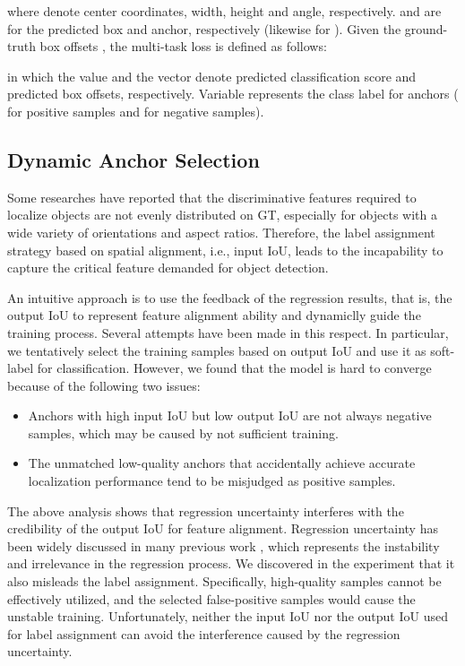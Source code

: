 \documentclass[letterpaper]{article} \usepackage{aaai21}  \usepackage{times}  \usepackage{helvet} \usepackage{courier}  \usepackage[hyphens]{url}  \usepackage{graphicx} \urlstyle{rm} \def\UrlFont{\rm}  \usepackage{natbib}  \usepackage{caption} \frenchspacing  \setlength{\pdfpagewidth}{8.5in}  \setlength{\pdfpageheight}{11in}  \usepackage{url}
\begin{document}
where  denote center coordinates, width, height and angle, respectively.  and  are for the predicted box and anchor, respectively (likewise for ). Given the ground-truth box offsets , the multi-task loss is defined as follows:

in which the value  and the vector  denote predicted classification score and predicted box offsets, respectively. Variable  represents the class label for anchors ( for positive samples and  for negative samples).

\subsection{Dynamic Anchor Selection}
Some researches \cite{zhang2019freeanchor, song2020revisiting} have reported that the discriminative features required to localize objects are not evenly distributed on GT, especially for objects with a wide variety of orientations and aspect ratios. Therefore, the label assignment strategy based on spatial alignment, i.e., input IoU, leads to the incapability to capture the critical feature demanded for object detection. 

An intuitive approach is to use the feedback of the regression results, that is, the output IoU to represent feature alignment ability and dynamiclly guide the training process. Several attempts \cite{jiang2018acquisition, li2020learning} have been made in this respect. In particular, we tentatively select the training samples based on output IoU and use it as soft-label for classification. However, we found that the model is hard to  converge because of the following two issues:

\begin{itemize}
	\item Anchors with high input IoU but low output IoU are not always negative samples, which may be caused by not sufficient training.
	\item The unmatched low-quality anchors that accidentally achieve accurate localization performance tend to be misjudged as positive samples.
\end{itemize} 


The above analysis shows that regression uncertainty interferes with the credibility of the output IoU for feature alignment. Regression uncertainty has been widely discussed in many previous work \cite{feng2018towards, choi2019gaussian, kendall2017uncertainties, choi2018uncertainty}, which represents the instability and irrelevance in the regression process. We discovered in the experiment that it also misleads the label assignment. Specifically, high-quality samples cannot be effectively utilized, and the selected false-positive samples would cause the unstable training. Unfortunately, neither the input IoU nor the output IoU used for label assignment can avoid the interference caused by the regression uncertainty.
\end{document}

